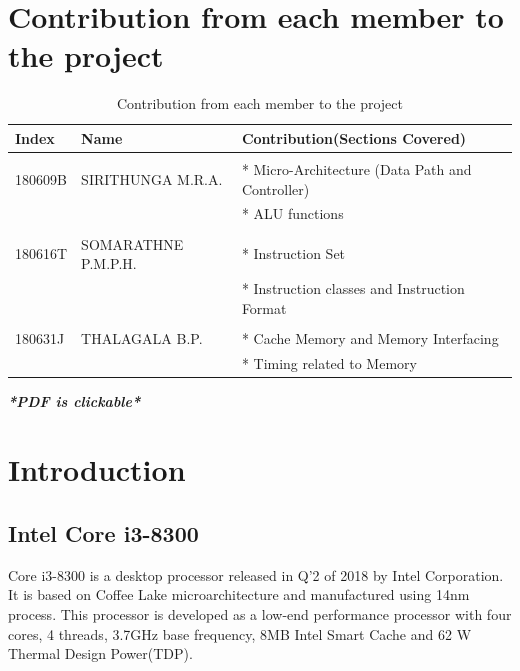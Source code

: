 \documentclass[a4paper,11pt]{article}
\begin{document}

\tableofcontents
\section*{\textbf{{Contribution from each member to the project}}}

\begin{table}[!h]
	\centering

		\begin{tabular}{|l|l|l|}
			\hline
			\textbf{Index}	&\textbf{Name} 	&\textbf{Contribution(Sections Covered)}\\ \hline
			&&\\
		180609B  	&SIRITHUNGA M.R.A. &* Micro-Architecture (Data Path and  Controller)\\
		&&* ALU functions\\ \hline&&\\

 		180616T  	&SOMARATHNE P.M.P.H. &* Instruction Set\\
 		&&*  Instruction classes and Instruction Format\\\hline&&\\

 		180631J		&THALAGALA B.P.&* Cache Memory and Memory Interfacing\\
 		&&*  Timing related to Memory\\\hline
		\end{tabular}

			\caption{Contribution from each member to the project}
\end{table}

\begin{center}
	\textit{\textbf{*PDF is clickable*}}
\end{center}

\pagebreak
\section{Introduction}
\subsection{Intel Core i3-8300}
Core i3-8300 is a desktop processor released in Q'2 of 2018 by Intel Corporation. It is based on Coffee Lake microarchitecture and manufactured using 14nm process. This processor is developed as a low-end performance processor with four cores, 4 threads, 3.7GHz base frequency, 8MB Intel Smart Cache and 62 W Thermal Design Power(TDP)\cite{i3doc}.
\end{document}

